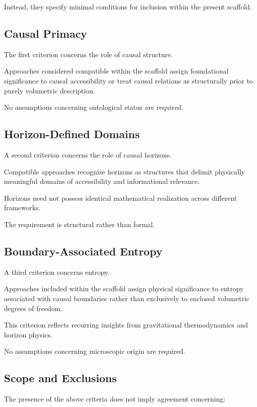 \documentclass[12pt,a4paper]{article}
\begin{document}
Instead, they specify minimal conditions for inclusion within the present scaffold.

\subsection{Causal Primacy}

The first criterion concerns the role of causal structure.

Approaches considered compatible within the scaffold assign foundational significance to causal accessibility or treat causal relations as structurally prior to purely volumetric description.

No assumptions concerning ontological status are required.

\subsection{Horizon-Defined Domains}

A second criterion concerns the role of causal horizons.

Compatible approaches recognize horizons as structures that delimit physically meaningful domains of accessibility and informational relevance.

Horizons need not possess identical mathematical realization across different frameworks.

The requirement is structural rather than formal.

\subsection{Boundary-Associated Entropy}

A third criterion concerns entropy.

Approaches included within the scaffold assign physical significance to entropy associated with causal boundaries rather than exclusively to enclosed volumetric degrees of freedom.

This criterion reflects recurring insights from gravitational thermodynamics and horizon physics.

No assumptions concerning microscopic origin are required.

\subsection{Scope and Exclusions}

The presence of the above criteria does not imply agreement concerning:
\end{document}
